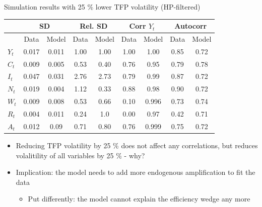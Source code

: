 \documentclass[9pt,xcolor={dvipsnames}]{beamer}
\newcommand{\bit}{\begin{itemize}}
\newcommand{\eit}{\end{itemize}}
\newcommand{\bc}{\color{blue}}
\begin{document}
\begin{frame}{Simulation results with 25 \% lower TFP volatility (HP-filtered)}

\begin{table}[h!]
	\centering
	\begin{tabular}{|l|cc|cc|cc|cc|}
		\multicolumn{1}{c}{} &\multicolumn{2}{c}{\textbf{SD}}&\multicolumn{2}{c}{\textbf{Rel. SD}}& \multicolumn{2}{c}{\textbf{Corr $Y_t$}} & \multicolumn{2}{c}{\textbf{Autocorr}}  \\
		\hline
		& Data &Model & Data & Model & Data & Model & Data & Model \\
		\hline
		$Y_t$ & 0.017 & 0.011 & 1.00 & 1.00 & 1.00 & 1.00 & \colorbox{white}{0.85} & \colorbox{white}{0.72} \\
		\hline
		$C_t$ & 0.009 & 0.005  & \colorbox{white}{0.53} & \colorbox{white}{0.40} & \colorbox{white}{0.76} & \colorbox{white}{0.95}  & 0.79 & 0.78 \\
		\hline
		$I_t$ & 0.047 & 0.031 & \colorbox{white}{2.76} & \colorbox{white}{2.73}  & \colorbox{white}{0.79} & \colorbox{white}{0.99} & 0.87 & 0.72 \\
		\hline
		$N_t$ & 0.019 &  0.004 & \colorbox{white}{1.12} & \colorbox{white}{0.33} & \colorbox{white}{0.88} &  \colorbox{white}{0.98} & 0.90 & 0.72 \\
		\hline
		$W_t$ & 0.009 & 0.008 & 0.53 & 0.66 & \colorbox{white}{0.10} & \colorbox{white}{0.996} & 0.73 & 0.74 \\
		\hline
		$R_t$ & 0.004 & 0.011  & \colorbox{white}{0.24} & \colorbox{white}{1.0} & \colorbox{white}{0.00} & \colorbox{white}{0.97} & \colorbox{white}{0.42} & \colorbox{white}{0.71} \\
		\hline
		$A_t$ & 0.012 & 0.09 & \colorbox{white}{0.71} & \colorbox{white}{0.80}  & 0.76 & 0.999 & 0.75 & 0.72 \\
		\hline
	\end{tabular}
	\captionsetup{font=small}
	\label{sim_results}
\end{table} 

\bit
\setlength\itemsep{1em}

\item Reducing TFP volatility by 25 \% does not affect any correlations, but reduces volalitility of all variables by 25 \% - why?

\item Implication: the model needs to add more {\bc endogenous amplification} to fit the data
\bit
\item Put differently: the model cannot explain the efficiency wedge any more
\eit

\eit

\end{frame}
\end{document}
